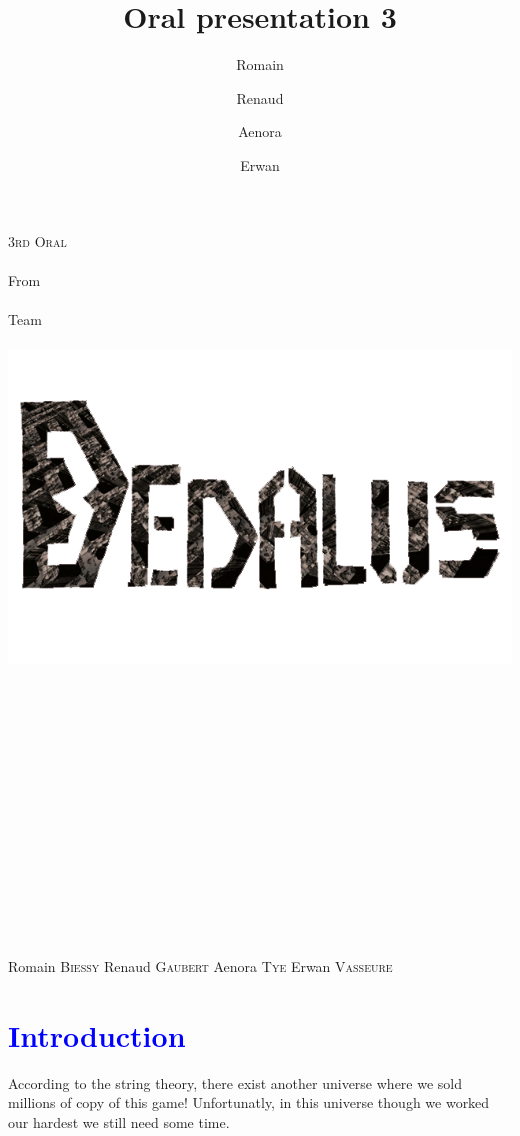 \documentclass[article]{report}             %
\title {Oral presentation 3}
\author {Romain\and Renaud\and Aenora\and Erwan}
\date {}
\begin{document}
	\thispagestyle{empty}
  	\begin{titlepage} 
		\vspace*{1cm} 
  		\begin{center} 
  			{\huge{\textsc{3rd Oral} \\ ~ \\{\large From}\\ ~\\ Team \\  ~ \\ }}
	  		\includegraphics[width = 14cm]{images/Titles/Dedalus.png}
			\\ ~ \\ ~ \\ ~ \\ ~ \\ ~ \\ ~ \\ ~ \\ ~ \\ ~ \\ ~ \\ ~ \\ ~ \\ ~ \\ ~ 
		\end{center}
  		\hfill {\large Romain \textsc{Biessy}}
  		\hfill {\large Renaud \textsc{Gaubert}}
  		\hfill {\large Aenora \textsc{Tye}}
  		\hfill {\large Erwan  \textsc{Vasseure}}
  	\end{titlepage} 

  	\tableofcontents
  		\setcounter{page}{2}
  		\newpage
		\chapter{\textcolor{blue}{Introduction}}
			According to the string theory, there exist another universe where we sold millions of copy of this game! Unfortunatly, in this universe though we worked our hardest we still need some time.\\
\end{document}
